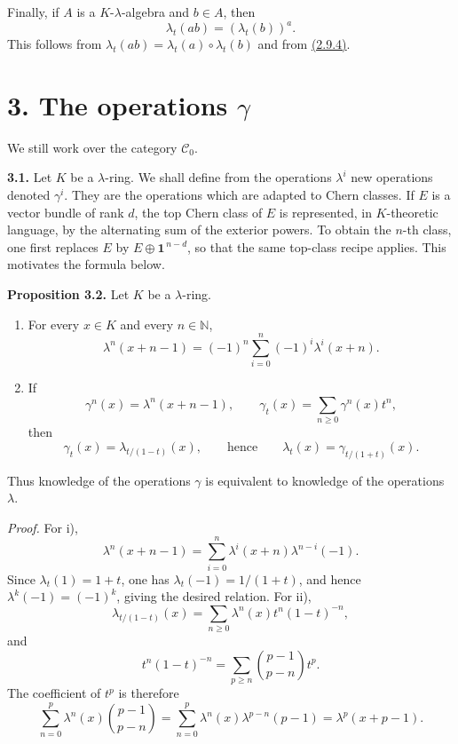 Finally, if \(A\) is a \(K\)-\(\lambda\)-algebra and \(b\in A\), then
\begin{equation}\tag{2.9.5}
  \lambda_t(ab)=(\lambda_t(b))^a .
\end{equation}
This follows from \(\lambda_t(ab)=\lambda_t(a)\circ\lambda_t(b)\) and from \hyperlink{sga6.e05.eq.2-9-4}{(2.9.4)}.

\section*{3. The operations \(\gamma\)}

We still work over the category \(\mathscr C_0\).

\textbf{3.1.} Let \(K\) be a \(\lambda\)-ring. We shall define from the operations \(\lambda^i\) new operations denoted \(\gamma^i\). They are the operations which are adapted to Chern classes. If \(E\) is a vector bundle of rank \(d\), the top Chern class of \(E\) is represented, in \(K\)-theoretic language, by the alternating sum of the exterior powers. To obtain the \(n\)-th class, one first replaces \(E\) by \(E\oplus\mathbf1^{\,n-d}\), so that the same top-class recipe applies. This motivates the formula below.

\textbf{Proposition 3.2.} Let \(K\) be a \(\lambda\)-ring.
\begin{enumerate}[label=\roman*)]
\item For every \(x\in K\) and every \(n\in\mathbb N\),
\[
  \lambda^n(x+n-1)=(-1)^n\sum_{i=0}^n(-1)^i\lambda^i(x+n).
\]
\item If
\[
  \gamma^n(x)=\lambda^n(x+n-1),\qquad
  \gamma_t(x)=\sum_{n\ge0}\gamma^n(x)t^n,
\]
then
\[
  \gamma_t(x)=\lambda_{t/(1-t)}(x),
  \qquad\text{hence}\qquad
  \lambda_t(x)=\gamma_{t/(1+t)}(x).
\]
\end{enumerate}
Thus knowledge of the operations \(\gamma\) is equivalent to knowledge of the operations \(\lambda\).

\emph{Proof.} For i),
\[
  \lambda^n(x+n-1)=\sum_{i=0}^{n}\lambda^i(x+n)\lambda^{n-i}(-1).
\]
Since \(\lambda_t(1)=1+t\), one has \(\lambda_t(-1)=1/(1+t)\), and hence \(\lambda^k(-1)=(-1)^k\), giving the desired relation. For ii),
\[
  \lambda_{t/(1-t)}(x)=\sum_{n\ge0}\lambda^n(x)t^n(1-t)^{-n},
\]
and
\[
  t^n(1-t)^{-n}=\sum_{p\ge n}\binom{p-1}{p-n}t^p.
\]
The coefficient of \(t^p\) is therefore
\[
  \sum_{n=0}^{p}\lambda^n(x)\binom{p-1}{p-n}
  =\sum_{n=0}^{p}\lambda^n(x)\lambda^{p-n}(p-1)
  =\lambda^p(x+p-1).
\]

